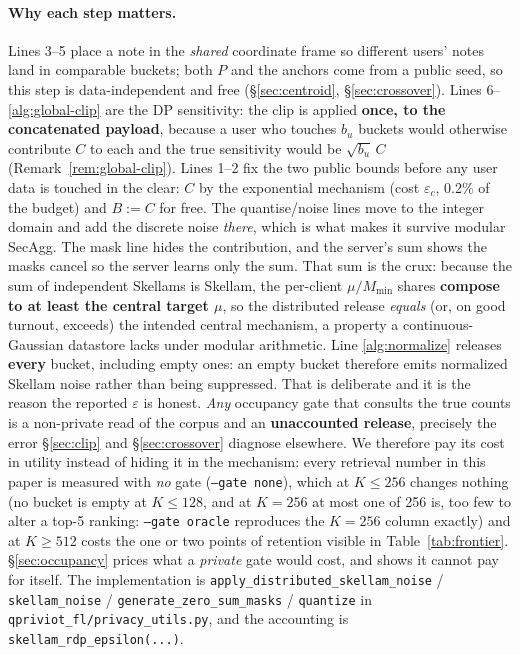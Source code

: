 \documentclass[pdflatex,sn-mathphys-num,12pt]{sn-jnl}
\theoremstyle{thmstyleone}%
\theoremstyle{thmstyletwo}%
\theoremstyle{thmstylethree}%
\newcommand{\eps}{\varepsilon}
\newcommand{\secref}[1]{\S\ref{#1}}
\begin{document}
\paragraph{Why each step matters.} Lines 3--5 place a note in the \emph{shared}
coordinate frame so different users' notes land in comparable buckets; both $P$ and the
anchors come from a public seed, so this step is data-independent and free
(\secref{sec:centroid}, \secref{sec:crossover}). Lines 6--\ref{alg:global-clip} are the
DP sensitivity: the clip is applied \textbf{once, to the concatenated payload}, because
a user who touches $b_u$ buckets would otherwise contribute $C$ to each and the true
sensitivity would be $\sqrt{b_u}\,C$ (Remark~\ref{rem:global-clip}). Lines 1--2 fix the
two public bounds before any user data is touched in the clear: $C$ by the exponential
mechanism (cost $\eps_c$, 0.2\% of the budget) and $B := C$ for free. The quantise/noise
lines move to the integer domain and add the discrete noise \emph{there}, which is what
makes it survive modular SecAgg. The mask line hides the contribution, and the server's
sum shows the masks cancel so the server learns only the sum. That sum is the crux:
because the sum of independent Skellams is Skellam, the per-client $\mu/M_{\min}$ shares
\textbf{compose to at least the central target $\mu$}, so the distributed release
\emph{equals} (or, on good turnout, exceeds) the intended central mechanism, a
property a continuous-Gaussian datastore lacks under modular arithmetic. Line
\ref{alg:normalize} releases \textbf{every} bucket, including empty ones: an empty bucket
therefore emits normalized Skellam noise rather than being suppressed. That is deliberate
and it is the reason the reported $\eps$ is honest. \emph{Any} occupancy gate that consults
the true counts is a non-private read of the corpus and an \textbf{unaccounted release},
precisely the error \secref{sec:clip} and \secref{sec:crossover} diagnose elsewhere. We
therefore pay its cost in utility instead of hiding it in the mechanism: every retrieval
number in this paper is measured with \emph{no} gate (\texttt{--gate none}), which at
$K \leq 256$ changes nothing (no bucket is empty at $K \leq 128$, and at $K = 256$ at most
one of 256 is, too few to alter a top-5 ranking: \texttt{--gate oracle} reproduces the
$K = 256$ column exactly) and at $K \geq 512$ costs the one or two
points of retention visible in Table~\ref{tab:frontier}. \secref{sec:occupancy} prices what
a \emph{private} gate would cost, and shows it cannot pay for itself. The implementation is
\texttt{apply\_distributed\_skellam\_noise} / \texttt{skellam\_noise} /
\texttt{generate\_zero\_sum\_masks} / \texttt{quantize} in
\texttt{qpriviot\_fl/privacy\_utils.py}, and the accounting is
\texttt{skellam\_rdp\_epsilon(...)}.
\end{document}
